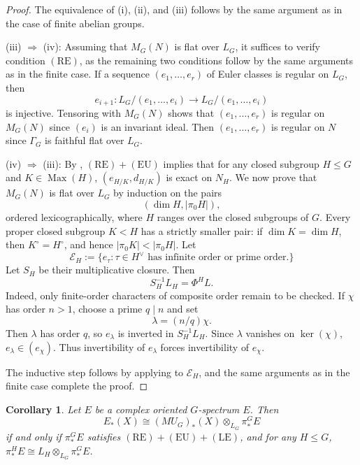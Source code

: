 \documentclass[11pt,reqno]{amsart}
\newtheorem{corollary}[corollary]{Corollary}
\newcommand{\Max}{\operatorname{Max}}
\begin{document}
\begin{proof}
  The equivalence of \textup{(i)}, \textup{(ii)}, and \textup{(iii)} follows by the same argument as in the case of finite abelian groups.

  \textup{(iii)} $\Longrightarrow$ \textup{(iv)}: Assuming that $M_G(N)$ is flat over $L_G$, it suffices to verify condition $(\mathrm{RE})$, as the remaining two conditions follow by the same arguments as in the finite case. If a sequence $(e_1,\dots, e_r)$ of Euler classes is regular on $L_G$, then 
  \[
  e_{i+1}: L_G/(e_1,\dots, e_i)\to L_G/(e_1,\dots, e_i)
  \]
  is injective. Tensoring with $M_G(N)$ shows that $(e_1,\dots, e_r)$ is regular on $M_G(N)$ since $(e_i)$ is an invariant ideal. Then $(e_1,\dots, e_r)$ is regular on $N$ since $\Gamma_G$ is faithful flat over $L_G$.

  \textup{(iv)} $\Longrightarrow$ \textup{(iii)}: By , $(\mathrm{RE})+(\mathrm{EU})$ implies that for any closed subgroup $H\leq G$ and $K\in \Max (H)$, $(e_{H/K},d_{H/K})$ is exact on $N_H$. We now prove that $M_G(N)$ is flat over $L_G$ by induction on the pairs
  \[
  (\dim H,|\pi_0 H|),
  \]
  ordered lexicographically, where $H$ ranges over the closed subgroups of $G$. Every proper closed subgroup $K<H$ has a strictly smaller pair: if $\dim K=\dim H$, then $K^\circ=H^\circ$, and hence $|\pi_0 K|<|\pi_0 H|$. Let 
  \[
  \mathcal E_H := \{e_\tau: \tau\in H^\vee \text{ has infinite order or prime order.}\}
  \]
  Let $S_H$ be their multiplicative closure.  Then
  \[
  S_H^{-1}L_H=\Phi^HL.
  \]
  Indeed, only finite-order characters of composite order remain to be checked. If $\chi$ has order $n>1$, choose a prime $q\mid n$ and set
  \[
  \lambda=(n/q)\chi.
  \]
  Then $\lambda$ has order $q$, so $e_\lambda$ is inverted in $S_H^{-1}L_H$. Since $\lambda$ vanishes on $\ker(\chi)$,  $e_\lambda\in(e_\chi)$. Thus invertibility of $e_\lambda$ forces invertibility of $e_\chi$.

  The inductive step follows by applying  to $\mathcal E_H$, and the same arguments as in the finite case complete the proof.
\end{proof}


\begin{corollary}\label{cor:compact representation}
  Let $E$ be a complex oriented $G$-spectrum $E$. Then 
  \[
  E_*(X) \cong (MU_G)_*(X)\otimes_{L_G} \pi_*^G E
  \]
  if and only if $\pi_*^G E$ satisfies $(\mathrm{RE})+(\mathrm{EU})+ (\mathrm{LE})$, and for any $H\leq G$, $\pi_*^H E \cong L_H\otimes_{L_G} \pi_*^G E$.
\end{corollary}
\end{document}
